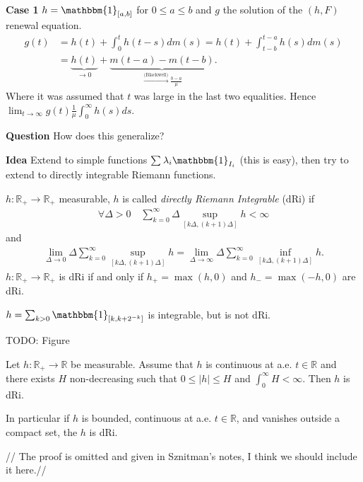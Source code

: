 \noindent
\textbf{Case 1} $h=\mathbbm{1}_{[a,b]} $ for $0\leq a \leq b$ and $g$ the solution of the $(h,F)$ renewal equation. 
\begin{align}
	g(t) &= h(t) + \int_{0}^{t} h(t-s)dm(s) = h(t) + \int_{t-b}^{t-a} h(s)dm(s) \\
	     &= \underbrace{h(t)}_{\to 0} + \underbrace{m(t-a) - m(t-b)}_{\stackrel{\textrm{(Blackwell)}}{\to} \frac{b-a}{\mu }}.
\end{align}
Where it was assumed that $t$ was large in the last two equalities. Hence $\lim_{t\to \infty } g(t) \frac{1}{\mu } \int_{0}^{\infty} h(s) ds$. 

\noindent \textbf{Question} How does this generalize?

{\color{blue}\noindent
\textbf{Idea} Extend to simple functions $\sum_{}^{} \lambda_i \mathbbm{1}_{I_i}$ (this is easy), then try to extend to directly integrable Riemann functions.}

\begin{defn}
	$h: \mathbb{R}_+ \to \mathbb{R}_+$ measurable, $h$ is called \emph{directly Riemann Integrable} (dRi) if 
\begin{align}
	\forall \Delta >0 \quad \sum_{k=0}^{\infty}\Delta \sup_{[k \Delta, (k+1)\Delta]} h < \infty
\end{align}
	and
	\begin{align}
		\lim_{\Delta \to 0} \Delta \sum_{k=0}^{\infty} \sup_{[k \Delta,(k+1)\Delta] } h = \lim _{\Delta \to \infty} \Delta \sum_{k=0}^{\infty} \inf_{[k \Delta, (k+1)\Delta]}h.
	\end{align}
	$h: \mathbb{R}_+ \to \mathbb{R}_+$ is dRi if and only if $h_+=\max(h,0)$ and $h_-=\max(-h,0)$ are dRi.
\end{defn}
\begin{rmk}
	$h=\sum_{k> 0 }^{} \mathbbm{1}_{[k,k+2^{-k}]} $ is integrable, but is not dRi.	

	{\color{blue} TODO: Figure}
\end{rmk}


\begin{prop}[]
	Let $h: \mathbb{R}_+ \to \mathbb{R}$ be measurable. Assume that $h$ is continuous at a.e. $t \in \mathbb{R}$ and there exists $H$ non-decreasing such that $0 \leq |h| \leq H$ and $\int_{0}^{\infty} H < \infty$. Then $h$ is dRi. 
\end{prop}
\begin{rmk}[]
	In particular if $h$ is bounded, continuous at a.e. $t \in \mathbb{R}$, and vanishes outside a compact set, the $h$ is dRi.
\end{rmk}
{\color{blue}// The proof is omitted and given in Sznitman's notes, I think we should include it here.//}

